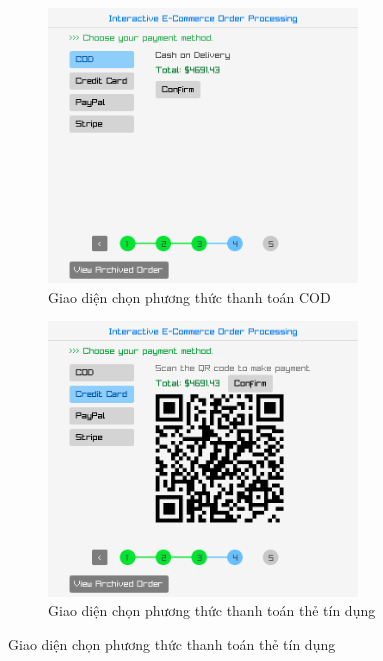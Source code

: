 \begin{figure}[!ht]
  \centering
  \begin{subfigure}{0.46\textwidth}
    \centering
    \includegraphics[width=0.9\textwidth]{../assets/screenshots/gui/payment_cod.png}
    \caption{Giao diện chọn phương thức thanh toán COD}
  \end{subfigure}
  \hfill
  \begin{subfigure}{0.46\textwidth}
    \centering
    \includegraphics[width=0.9\textwidth]{../assets/screenshots/gui/payment_creditcard.png}
    \caption{Giao diện chọn phương thức thanh toán thẻ tín dụng}
  \end{subfigure}

\end{figure}
